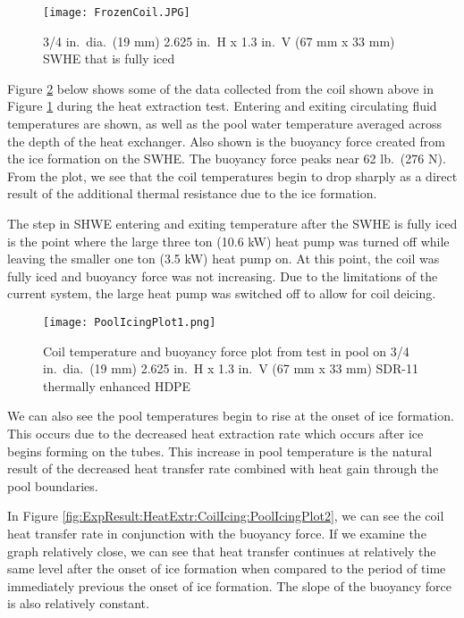 	\begin{figure}
		\centering
		\texttt{[image: FrozenCoil.JPG]}
		\caption[Fully iced surface water heat exchanger]{3/4 in.\ dia.\ (19 mm) 2.625 in.\ H x 1.3 in.\ V (67 mm x 33 mm) SWHE that is fully iced}
		\label{fig:ExpResult:HeatExtr:CoilIcing:FrozenCoil}
	\end{figure}

Figure \ref{fig:ExpResult:HeatExtr:CoilIcing:PoolIcingPlot1} below shows some of the data collected from the coil shown above in Figure \ref{fig:ExpResult:HeatExtr:CoilIcing:FrozenCoil} during the heat extraction test. Entering and exiting circulating fluid temperatures are shown, as well as the pool water temperature averaged across the depth of the heat exchanger. Also shown is the buoyancy force created from the ice formation on the SWHE. The buoyancy force peaks near 62 lb.\ (276 N). From the plot, we see that the coil temperatures begin to drop sharply as a direct result of the additional thermal resistance due to the ice formation. 

The step in SHWE entering and exiting temperature after the SWHE is fully iced is the point where the large three ton (10.6 kW) heat pump was turned off while leaving the smaller one ton (3.5 kW) heat pump on. At this point, the coil was fully iced and buoyancy force was not increasing. Due to the limitations of the current system, the large heat pump was switched off to allow for coil deicing.

	\begin{figure}
		\centering
		\texttt{[image: PoolIcingPlot1.png]}
		\caption[Coil temperature and buoyancy force from coil icing test on the 3/4 in.\ dia.\ (19 mm) 2.625 in.\ H x 1.3 in.\ V (67 mm x 33 mm) coil]{Coil temperature and buoyancy force plot from test in pool on 3/4 in.\ dia.\ (19 mm) 2.625 in.\ H x 1.3 in.\ V (67 mm x 33 mm) SDR-11 thermally enhanced HDPE}
		\label{fig:ExpResult:HeatExtr:CoilIcing:PoolIcingPlot1}
	\end{figure}

We can also see the pool temperatures begin to rise at the onset of ice formation. This occurs due to the decreased heat extraction rate which occurs after ice begins forming on the tubes. This increase in pool temperature is the natural result of the decreased heat transfer rate combined with heat gain through the pool boundaries.

In Figure \ref{fig:ExpResult:HeatExtr:CoilIcing:PoolIcingPlot2}, we can see the coil heat transfer rate in conjunction with the buoyancy force. If we examine the graph relatively close, we can see that heat transfer continues at relatively the same level after the onset of ice formation when compared to the period of time immediately previous the onset of ice formation. The slope of the buoyancy force is also relatively constant.

